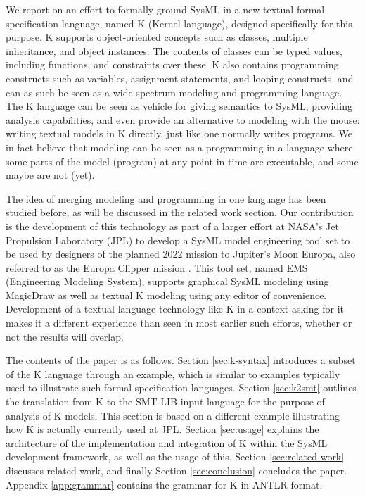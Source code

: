 We report on an effort to formally ground SysML in a new textual
formal specification language, named K (Kernel language), designed
specifically for this purpose.  K supports object-oriented concepts
such as classes, multiple inheritance, and object instances. The
contents of classes can be typed values, including functions, and
constraints over these. K also contains programming constructs such as
variables, assignment statements, and looping constructs, and can as
such be seen as a wide-spectrum modeling and programming language.
The K language can be seen as vehicle for giving semantics to SysML,
providing analysis capabilities, and even provide an alternative to
modeling with the mouse: writing textual models in K directly, just
like one normally writes programs.  We in fact believe that modeling
can be seen as a programming in a language where some parts of the
model (program) at any point in time are executable, and some maybe
are not (yet).

The idea of merging modeling and programming in one language has been
studied before, as will be discussed in the related work section. Our
contribution is the development of this technology as part of a larger
effort at NASA’s Jet Propulsion Laboratory (JPL) to develop a SysML
model engineering tool set to be used by designers of the planned 2022
mission to Jupiter's Moon Europa, also referred to as the Europa
Clipper mission \cite{europa-clipper}. This tool set, named EMS
(Engineering Modeling System), supports graphical SysML modeling using
MagicDraw \cite{magicdraw} as well as textual K modeling using any
editor of convenience. Development of a textual language technology
like K in a context asking for it makes it a different experience than
seen in most earlier such efforts, whether or not the results will
overlap.

The contents of the paper is as follows.  Section \ref{sec:k-syntax}
introduces a subset of the K language through an example, which is
similar to examples typically used to illustrate such formal
specification languages. Section \ref{sec:k2smt} outlines the
translation from K to the SMT-LIB input language for the purpose of
analysis of K models. This section is based on a different example
illustrating how K is actually currently used at JPL. Section
\ref{sec:usage} explains the architecture of the implementation and
integration of K within the SysML development framework, as well as
the usage of this. Section \ref{sec:related-work} discusses related
work, and finally Section \ref{sec:conclusion} concludes the
paper. Appendix \ref{app:grammar} contains the grammar for K in ANTLR
\cite{antlr} format.
